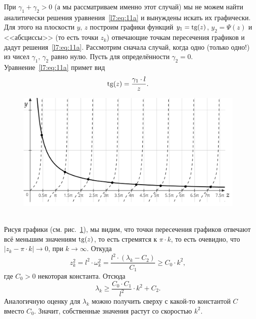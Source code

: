 \noindent При $\gamma_1+\gamma_2>0$ (а мы рассматриваем именно этот случай) мы не можем найти аналитически решения уравнения~\eqref{l7:eq:11a} и вынуждены искать их графически. Для этого на плоскости $y,\,z$ построим графики функций $y_1=\operatorname{tg}(z)$, $y_2=\Psi(z)$ и  <<абсциссы>> (то есть точки $z_k$) отвечающие точкам пересечения графиков и дадут решения~\eqref{l7:eq:11a}. Рассмотрим сначала случай, когда одно (только одно!) из чисел $\gamma_1,\,\gamma_2$ равно нулю. Пусть для определённости $\gamma_2=0$. Уравнение~\eqref{l7:eq:11a} примет вид
\begin{equation*}
	\operatorname{tg}(z)=\dfrac{\gamma_1\cdot l}{z}.
\end{equation*}
\begin{figure}[H]\centering
	\includegraphics[width=0.7\linewidth]{picture1}
	\caption{~}
	\label{l7:fig:1}
\end{figure}
Рисуя графики (см. рис.~\ref{l7:fig:1}), мы видим, что точки пересечения графиков отвечают всё меньшим значениям $\operatorname{tg}(z)$, то есть стремятся к $\pi\cdot k$, то есть очевидно, что $|z_k-\pi\cdot  k|\to0$, при $k\to\infty$. Откуда
\begin{equation*}
	 z_k^2=l^2\cdot\omega_k^2=\dfrac{l^2\cdot(\lambda_k-C_2)}{C_1}\geqslant C_0\cdot k^2,
\end{equation*}	
где $C_0>0$ некоторая константа. Отсюда
\begin{equation*}
	\lambda_k\geqslant\frac{C_0\cdot C_1}{l^2}\cdot k^2+C_2.
\end{equation*}
Аналогичную оценку для $\lambda_k$ можно получить сверху с какой-то константой $C$ вместо $C_0$. Значит, собственные значения растут со скоростью $k^2$.

